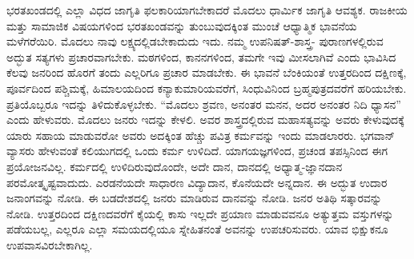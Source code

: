 ಭರತಖಂಡದಲ್ಲಿ ಎಲ್ಲಾ ವಿಧದ ಜಾಗೃತಿ ಫಲಕಾರಿಯಾಗಬೇಕಾದರೆ ಮೊದಲು ಧಾರ್ಮಿಕ ಜಾಗೃತಿ ಆವಶ್ಯಕ. ರಾಜಕೀಯ ಮತ್ತು ಸಾಮಾಜಿಕ ವಿಷಯಗಳಿಂದ ಭರತಖಂಡವನ್ನು ತುಂಬುವುದಕ್ಕಿಂತ ಮುಂಚೆ ಆಧ್ಯಾತ್ಮಿಕ ಭಾವನೆಯ ಮಳೆಗರೆಯಿರಿ. ಮೊದಲು ನಾವು ಲಕ್ಷ್ಯದಲ್ಲಿಡಬೇಕಾದುದು ಇದು. ನಮ್ಮ ಉಪನಿಷತ್​-ಶಾಸ್ತ್ರ- ಪುರಾಣಗಳಲ್ಲಿರುವ ಅದ್ಭುತ ಸತ್ಯಗಳು ಪ್ರಚಾರವಾಗಬೇಕು. ಮಠಗಳಿಂದ, ಕಾನನಗಳಿಂದ, ತಮಗೇ ಇವು ಮೀಸಲಾಗಿವೆ ಎಂದು ಭಾವಿಸಿದ ಕೆಲವು ಜನರಿಂದ ಹೊರಗೆ ತಂದು ಎಲ್ಲರಿಗೂ ಪ್ರಚಾರ ಮಾಡಬೇಕು. ಈ ಭಾವನೆ ಬೆಂಕಿಯಂತೆ ಉತ್ತರದಿಂದ ದಕ್ಷಿಣಕ್ಕೆ, ಪೂರ್ವದಿಂದ ಪಶ್ಚಿಮಕ್ಕೆ, ಹಿಮಾಲಯದಿಂದ ಕನ್ಯಾಕುಮಾರಿಯವರೆಗೆ, ಸಿಂಧುವಿನಿಂದ ಬ್ರಹ್ಮಪುತ್ರದವರೆಗೆ ಹರಿಯಬೇಕು. ಪ್ರತಿಯೊಬ್ಬರೂ ಇದನ್ನು ತಿಳಿದುಕೊಳ್ಳಬೇಕು. “ಮೊದಲು ಶ್ರವಣ, ಅನಂತರ ಮನನ, ಅದರ ಅನಂತರ ನಿದಿ ಧ್ಯಾಸನ” ಎಂದು ಹೇಳುವರು. ಮೊದಲು ಜನರು ಇದನ್ನು ಕೇಳಲಿ. ಅವರ ಶಾಸ್ತ್ರದಲ್ಲಿರುವ ಮಹಾಸತ್ಯವನ್ನು ಅವರು ಕೇಳುವುದಕ್ಕೆ ಯಾರು ಸಹಾಯ ಮಾಡುವರೋ ಅವರು ಅದಕ್ಕಿಂತ ಹೆಚ್ಚು ಪವಿತ್ರ ಕರ್ಮವನ್ನು ಇಂದು ಮಾಡಲಾರರು. ಭಗವಾನ್​ ವ್ಯಾಸರು ಹೇಳುವಂತೆ ಕಲಿಯುಗದಲ್ಲಿ ಒಂದು ಕರ್ಮ ಉಳಿದಿದೆ. ಯಾಗಯಜ್ಞಗಳಿಂದ, ಪ್ರಚಂಡ ತಪಸ್ಸಿನಿಂದ ಈಗ ಪ್ರಯೋಜನವಿಲ್ಲ. ಕರ್ಮದಲ್ಲಿ ಉಳಿದಿರುವುದೊಂದೇ, ಅದೇ ದಾನ, ದಾನದಲ್ಲಿ ಅಧ್ಯಾತ್ಮ-ಜ್ಞಾನದಾನ ಪರಮೋತ್ಕೃಷ್ಟವಾದುದು. ಎರಡನೆಯದೇ ಸಾಧಾರಣ ವಿದ್ಯಾದಾನ, ಕೊನೆಯದೇ ಅನ್ನದಾನ. ಈ ಅದ್ಭುತ ಉದಾರ ಜನಾಂಗವನ್ನು ನೋಡಿ. ಈ ಬಡದೇಶದಲ್ಲಿ ಜನರು ಮಾಡಿರುವ ದಾನವನ್ನು ನೋಡಿ. ಜನರ ಅತಿಥಿ ಸತ್ಕಾರವನ್ನು ನೋಡಿ. ಉತ್ತರದಿಂದ ದಕ್ಷಿಣದವರೆಗೆ ಕೈಯಲ್ಲಿ ಕಾಸು ಇಲ್ಲದೇ ಪ್ರಯಾಣ ಮಾಡುವವನೂ ಅತ್ಯುತ್ತಮ ವಸ್ತುಗಳನ್ನು ಪಡೆಯಬಲ್ಲ, ಎಲ್ಲರೂ ಎಲ್ಲಾ ಸಮಯದಲ್ಲಿಯೂ ಸ್ನೇಹಿತನಂತೆ ಅವನನ್ನು ಉಪಚರಿಸುವರು. ಯಾವ ಭಿಕ್ಷುಕನೂ ಉಪವಾಸವಿರಬೇಕಾಗಿಲ್ಲ.

